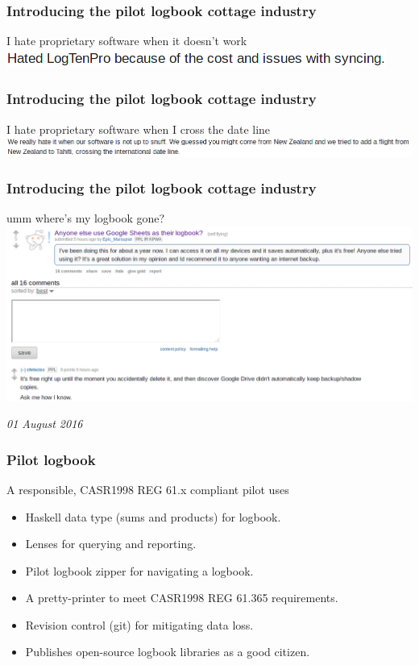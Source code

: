 \begin{frame}
\frametitle{Introducing the pilot logbook cottage industry}
\begin{block}{I hate proprietary software when it doesn't work}
\includegraphics[height=0.05\textheight]{image/logbook-5.png}
\end{block}
\end{frame}

\begin{frame}
\frametitle{Introducing the pilot logbook cottage industry}
\begin{block}{I hate proprietary software when I cross the date line}
\includegraphics[height=0.05\textheight]{image/logbook-6.png}
\end{block}
\end{frame}

\begin{frame}
\frametitle{Introducing the pilot logbook cottage industry}
\begin{block}{umm where's my logbook gone?}
\includegraphics[height=0.4\textheight]{image/logbook-7.png}
\end{block}
\par
\tiny{\emph{01 August 2016}}
\end{frame}

\begin{frame}
\frametitle{Pilot logbook}
\begin{block}{A responsible, CASR1998 REG 61.x compliant pilot uses}
\begin{itemize}
\item<1-> Haskell data type (sums and products) for logbook.
\item<1-> Lenses for querying and reporting.
\item<1-> Pilot logbook zipper for navigating a logbook.
\item<1-> A pretty-printer to meet CASR1998 REG 61.365 requirements.
\item<1-> Revision control (git) for mitigating data loss.
\item<1-> Publishes open-source logbook libraries as a good citizen.
\end{itemize}
\end{block}
\end{frame}

